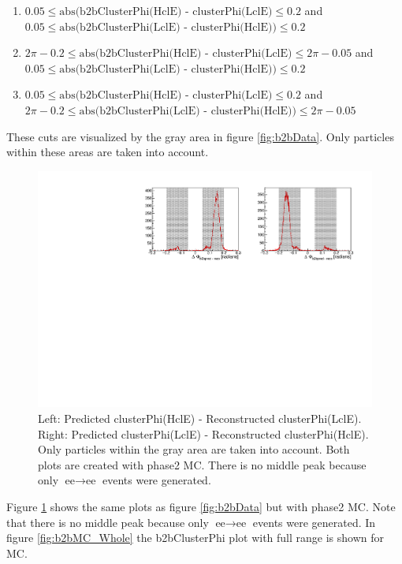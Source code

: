 \documentclass[a4paper,11pt,twosided,final,german,openbib,pdftex,listof=totoc,bibliography=totoc]{scrbook}
\begin{document}
\begin{enumerate}[label=(\alph*)]
	\item $0.05 \leq \textrm{abs(b2bClusterPhi(HclE) - clusterPhi(LclE)} \leq 0.2$ and $ 0.05 \leq \textrm{abs(b2bClusterPhi(LclE) - clusterPhi(HclE))} \leq 0.2$
	\item $2\pi - 0.2 \leq \textrm{abs(b2bClusterPhi(HclE) - clusterPhi(LclE)} \leq 2\pi - 0.05$ and $ 0.05 \leq \textrm{abs(b2bClusterPhi(LclE) - clusterPhi(HclE))} \leq 0.2$
	\item $0.05 \leq \textrm{abs(b2bClusterPhi(HclE) - clusterPhi(LclE)} \leq 0.2 $ and $2\pi - 0.2 \leq \textrm{abs(b2bClusterPhi(LclE) - clusterPhi(HclE))} \leq 2\pi - 0.05$
\end{enumerate}

These cuts are visualized by the gray area in figure \ref{fig:b2bData}. Only particles within these areas are taken into account.




\begin{figure}[h!]
	\centering
	\includegraphics[width=\textwidth]{Plots/master/sb2b_MC.pdf}
	\caption[b2bClusterPhi - clusterPhi For MC]{Left: Predicted clusterPhi(HclE) - Reconstructed clusterPhi(LclE). Right: Predicted clusterPhi(LclE) - Reconstructed clusterPhi(HclE). Only particles within the gray area are taken into account. Both plots are created with phase2 MC. There is no middle peak because only $\textrm{ee} \rightarrow \textrm{ee}$ events were generated.}
	\label{fig:b2bMC}
\end{figure}



Figure \ref{fig:b2bMC} shows the same plots as figure \ref{fig:b2bData} but with phase2 MC. Note that there is no middle peak because only $\textrm{ee} \rightarrow \textrm{ee}$ events were generated. In figure \ref{fig:b2bMC_Whole} the b2bClusterPhi plot with full range is shown for MC.
\end{document}
